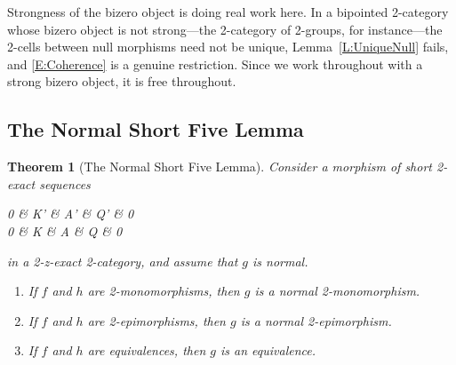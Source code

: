 \documentclass[reqno,a4paper]{amsart}
\numberwithin{equation}{section}
\theoremstyle{plain}
\newtheorem{theorem}[subsection]{Theorem}
\theoremstyle{definition}
\def\nameit#1{\textrm{#1}~}
\def\lemx{\nameit{Lemma}}
\def\phi{\varphi}
\renewcommand{\1}{\onecat{1}}
\begin{document}
Strongness of the bizero object is doing real work here. In a bipointed 2-category whose bizero object is not strong---the 2-category of 2-groups, for instance---the 2-cells between null morphisms need not be unique, \lemx\ref{L:UniqueNull} fails, and \eqref{E:Coherence} is a genuine restriction. Since we work throughout with a strong bizero object, it is free throughout.

\subsection{The Normal Short Five Lemma}\label{SS:NSFL}

\begin{theorem}[The Normal Short Five Lemma]\label{NSFL}
	Consider a morphism of short 2-exact sequences
	\begin{cd}[5][5]
		0 \& {K'} \& {A'} \& {Q'} \& 0 \\
		0 \& K \& A \& Q \& 0
		\arrow[from=1-1, to=1-2]
		\arrow["{k'}", from=1-2, to=1-3]
		\arrow[""{name=0, anchor=center, inner sep=0}, "{f}"', from=1-2, to=2-2]
		\arrow["{q'}", from=1-3, to=1-4]
		\arrow[""{name=1, anchor=center, inner sep=0}, "{g}", from=1-3, to=2-3]
		\arrow[from=1-4, to=1-5]
		\arrow[""{name=2, anchor=center, inner sep=0}, "{h}", from=1-4, to=2-4]
		\arrow[from=2-1, to=2-2]
		\arrow["k"', from=2-2, to=2-3]
		\arrow["q"', from=2-3, to=2-4]
		\arrow[from=2-4, to=2-5]
		\arrow["\phi_K"{inner sep=1.1ex},shift right=1, iso, from=0, to=1]
		\arrow["\phi_Q"{inner sep=1.1ex},shift right=1, iso, from=1, to=2]
	\end{cd}
	in a 2-z-exact 2-category, and assume that \(g\) is normal.
	\begin{enumerate}
		\item If \(f\) and \(h\) are 2-monomorphisms, then \(g\) is a normal 2-monomorphism.
		\item If \(f\) and \(h\) are 2-epimorphisms, then \(g\) is a normal 2-epimorphism.
		\item If \(f\) and \(h\) are equivalences, then \(g\) is an equivalence.
	\end{enumerate}
\end{theorem}
\end{document}
